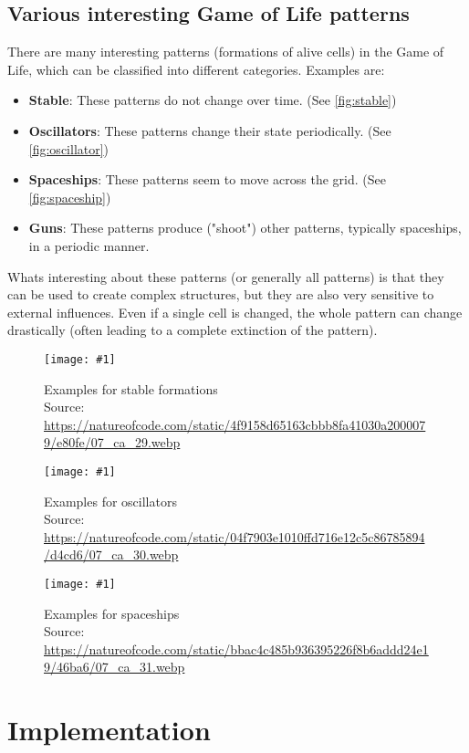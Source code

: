 \documentclass[a4paper,12pt]{llncs}
\numberwithin{equation}{section}
\newcommand{\imagewithwidth}[5]{
  \begin{figure}[htbp]%
    \begin{center}%
      \texttt{[image: \#1]}%
      \caption[#5]{#4}%
      \label{#3}%
    \end{center}%
  \end{figure}
}
\begin{document}
\subsection{Various interesting Game of Life patterns}
There are many interesting patterns (formations of alive cells) in the Game of Life, which can be classified into different categories. Examples are:
\begin{itemize}
  \item \textbf{Stable}: These patterns do not change over time. (See \autoref{fig:stable})
  \item \textbf{Oscillators}: These patterns change their state periodically. (See \autoref{fig:oscillator})
  \item \textbf{Spaceships}: These patterns seem to move across the grid. (See \autoref{fig:spaceship})
  \item \textbf{Guns}: These patterns produce ("shoot") other patterns, typically spaceships, in a periodic manner.
\end{itemize}
Whats interesting about these patterns (or generally all patterns) is that they can be used to create complex structures,
but they are also very sensitive to external influences. Even if a single cell is changed, the whole pattern can change drastically (often leading to a complete extinction of the pattern).
\imagewithwidth{figures/stable}{0.7\textwidth}{fig:stable}{Examples for stable formations\\Source: \url{https://natureofcode.com/static/4f9158d65163cbbb8fa41030a2000079/e80fe/07_ca_29.webp}}{}
\imagewithwidth{figures/oscillator}{0.7\textwidth}{fig:oscillator}{Examples for oscillators\\Source: \url{https://natureofcode.com/static/04f7903e1010ffd716e12c5c86785894/d4cd6/07_ca_30.webp}}{}
\imagewithwidth{figures/spaceship}{0.7\textwidth}{fig:spaceship}{Examples for spaceships\\Source: \url{https://natureofcode.com/static/bbac4c485b936395226f8b6addd24e19/46ba6/07_ca_31.webp}}{}

\section{Implementation}
\end{document}
